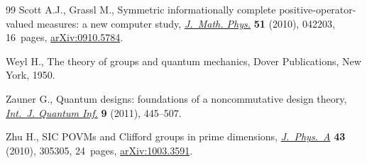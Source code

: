 \documentclass[pdftex]{sigma}
\numberwithin{equation}{section}
\begin{document}
\begin{thebibliography}{99}
Scott A.J., Grassl M., Symmetric informationally complete
 positive-operator-valued measures: a new computer study, \href{https://doi.org/10.1063/1.3374022}{\textit{J.~Math.
 Phys.}} \textbf{51} (2010), 042203, 16~pages, \href{https://arxiv.org/abs/0910.5784}{arXiv:0910.5784}.

Weyl H., The theory of groups and quantum mechanics, Dover Publications, New
 York, 1950.

Zauner G., Quantum designs: foundations of a noncommutative design theory,
 \href{https://doi.org/10.1142/S0219749911006776}{\textit{Int.~J. Quantum Inf.}} \textbf{9} (2011), 445--507.

Zhu H., S{IC} {POVM}s and {C}lifford groups in prime dimensions,
  \href{https://doi.org/10.1088/1751-8113/43/30/305305}{\textit{J.~Phys.~A}} \textbf{43} (2010), 305305, 24~pages, \href{https://arxiv.org/abs/1003.3591}{arXiv:1003.3591}.

\end{thebibliography}\LastPageEnding
\end{document}
